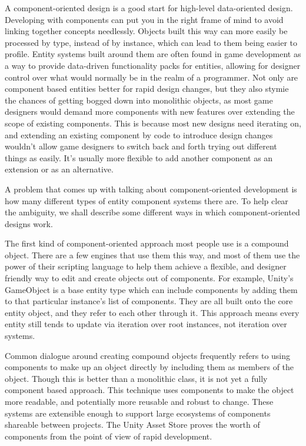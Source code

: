 \documentclass[a4paper,12pt]{article}
\begin{document}
A component-oriented design is a good start for high-level data-oriented design.
Developing with components can put you in the right frame of mind to avoid linking together concepts needlessly.
Objects built this way can more easily be processed by type, instead of by instance, which can lead to them being easier to profile.
Entity systems built around them are often found in game development as a way to provide data-driven functionality packs for entities, allowing for designer control over what would normally be in the realm of a programmer.
Not only are component based entities better for rapid design changes, but they also stymie the chances of getting bogged down into monolithic objects, as most game designers would demand more components with new features over extending the scope of existing components.
This is because most new designs need iterating on, and extending an existing component by code to introduce design changes wouldn't allow game designers to switch back and forth trying out different things as easily.
It's usually more flexible to add another component as an extension or as an alternative.

A problem that comes up with talking about component-oriented development is how many different types of entity component systems there are.
To help clear the ambiguity, we shall describe some different ways in which component-oriented designs work.

The first kind of component-oriented approach most people use is a compound object.
There are a few engines that use them this way, and most of them use the power of their scripting language to help them achieve a flexible, and designer friendly way to edit and create objects out of components.
For example, Unity's GameObject is a base entity type which can include components by adding them to that particular instance's list of components.
They are all built onto the core entity object, and they refer to each other through it.
This approach means every entity still tends to update via iteration over root instances, not iteration over systems.

Common dialogue around creating compound objects frequently refers to using components to make up an object directly by including them as members of the object.
Though this is better than a monolithic class, it is not yet a fully component based approach.
This technique uses components to make the object more readable, and potentially more reusable and robust to change.
These systems are extensible enough to support large ecosystems of components shareable between projects.
The Unity Asset Store proves the worth of components from the point of view of rapid development.
\end{document}
